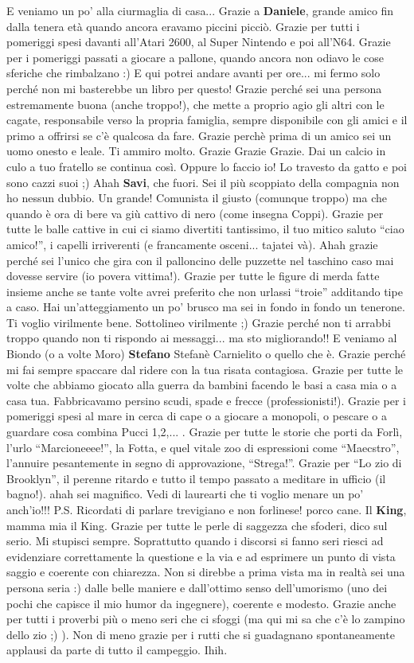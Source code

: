 \documentclass[10pt]{amsart}
\newcommand{\n}[1]{{\Large \bf #1}}
\begin{document}
E veniamo un po' alla ciurmaglia di casa...
Grazie a \n{Daniele}, grande amico fin dalla tenera età quando ancora eravamo piccini picciò. Grazie per tutti i pomeriggi spesi davanti all'Atari 2600, al Super Nintendo e poi all'N64. Grazie per i pomeriggi passati a giocare a pallone, quando ancora non odiavo le cose sferiche che rimbalzano :) E qui potrei andare avanti per ore... mi fermo solo perché non mi basterebbe un libro per questo!  Grazie perché sei una persona estremamente buona (anche troppo!), che mette a proprio agio gli altri con le cagate, responsabile verso la propria famiglia, sempre disponibile con gli amici e il primo a offrirsi se c'è qualcosa da fare. Grazie perchè prima di un amico sei un uomo onesto e leale. Ti ammiro molto. Grazie Grazie Grazie. Dai un calcio in culo a tuo fratello se continua così. Oppure lo faccio io! Lo travesto da gatto e poi sono cazzi suoi ;)
Ahah \n{Savi}, che fuori. Sei il più scoppiato della compagnia non ho nessun dubbio. Un grande! Comunista il giusto (comunque troppo) ma che quando è ora di bere va giù cattivo di nero (come insegna Coppi). Grazie per tutte le balle cattive in cui ci siamo divertiti tantissimo, il tuo mitico saluto ``ciao amico!'', i capelli irriverenti (e francamente osceni... tajatei và). Ahah grazie perché sei l'unico che gira con il palloncino delle puzzette nel taschino caso mai dovesse servire (io povera vittima!). Grazie per tutte le figure di merda fatte insieme anche se tante volte avrei preferito che non urlassi ``troie'' additando tipe a caso. Hai un'atteggiamento un po' brusco ma sei in fondo in fondo un tenerone. Ti voglio virilmente bene. Sottolineo virilmente ;)  Grazie perché non ti arrabbi troppo quando non ti rispondo ai messaggi... ma sto migliorando!!
E veniamo al Biondo (o a volte Moro) \n{Stefano} Stefanè Carnielito o quello che è. Grazie perché mi fai sempre spaccare dal ridere con la tua risata contagiosa. Grazie per tutte le volte che abbiamo giocato alla guerra da bambini facendo le basi a casa mia o a casa tua. Fabbricavamo persino scudi, spade e frecce (professionisti!). Grazie per i pomeriggi spesi al mare in cerca di cape o a giocare a monopoli, o pescare o a guardare cosa combina Pucci 1,2,... . Grazie per tutte le storie che porti da Forlì, l'urlo ``Marcioneeee!'', la Fotta, e quel vitale zoo di espressioni come ``Maecstro'', l'annuire pesantemente in segno di approvazione, ``Strega!''. Grazie per ``Lo zio di Brooklyn'', il perenne ritardo e tutto il tempo passato a meditare in ufficio (il bagno!). ahah sei magnifico. Vedi di laurearti che ti voglio menare un po' anch'io!!! P.S. Ricordati di parlare trevigiano e non forlinese! porco cane. Il \n{King}, mamma mia il King. Grazie per tutte le perle di saggezza che sfoderi, dico sul serio. Mi stupisci sempre. Soprattutto quando i discorsi si fanno seri riesci ad evidenziare correttamente la questione e la via e ad esprimere un punto di vista saggio e coerente con chiarezza. Non si direbbe a prima vista ma in realtà sei una persona seria :) dalle belle maniere e dall'ottimo senso dell'umorismo (uno dei pochi che capisce il mio humor da ingegnere), coerente e modesto. Grazie anche per tutti i proverbi più o meno seri che ci sfoggi (ma qui mi sa che c'è lo zampino dello zio ;) ). Non di meno grazie per i rutti che si guadagnano spontaneamente applausi da parte di tutto il campeggio. Ihih.
\end{document}
